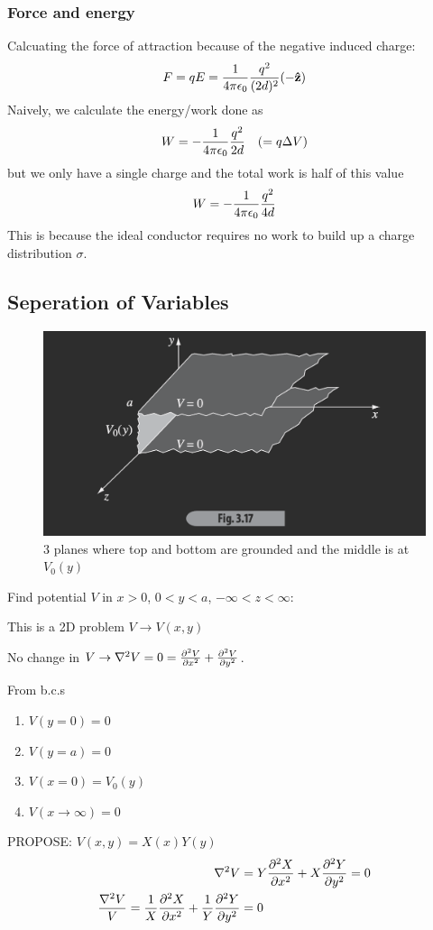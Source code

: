 \documentclass[../main.tex]{subfiles}
\begin{document}
\subsubsection{Force and energy}

Calcuating the force of attraction because of the negative induced charge:
\begin{align*}
    F = qE = \frac{1}{4\pi\epsilon_0} \frac{q^2}{(2d)^2} (-\vu z)
\end{align*}
Naively, we calculate the energy/work done as
\begin{align*}
    W = -\frac{1}{4\pi\epsilon_0} \frac{q^2}{2d} \quad (=q \Delta V)
\end{align*}
but we only have a single charge and the total work is half of this value
\begin{align*}
    W = -\frac{1}{4\pi\epsilon_0} \frac{q^2}{4d}
\end{align*}
This is because the ideal conductor requires no work to build up a charge distribution $\sigma$.

\newpage
\subsection{Seperation of Variables}

\begin{figure}[ht]
    \centering
    \includegraphics[width=0.5\linewidth]{fig3_17.png}
    \caption{3 planes where top and bottom are grounded and the middle is at $V_0(y)$}
    \label{fig:lecture3_17}
\end{figure}

Find potential $V$ in $x > 0$, $0< y < a$, $-\infty < z < \infty$:

This is a 2D problem $V\to V(x,y)$

No change in $V \to \laplacian V = 0 = \pdv[2]{V}{x} + \pdv[2]{V}{y}$. 

From b.c.s
\begin{enumerate}
    \item $V(y=0) = 0$
    \item $V(y=a) = 0$
    \item $V(x=0) = V_0(y)$
    \item $V(x\to\infty) = 0$
\end{enumerate}

PROPOSE: $V(x,y) = X(x)Y(y)$
\begin{align*}
    \laplacian V &= Y\pdv[2]{X}{x} + X\pdv[2]{Y}{y} = 0 \\
    \frac{\laplacian V}{V} = \frac{1}{X} \pdv[2]{X}{x} + \frac{1}{Y} \pdv[2]{Y}{y} &= 0
\end{align*}
\end{document}
